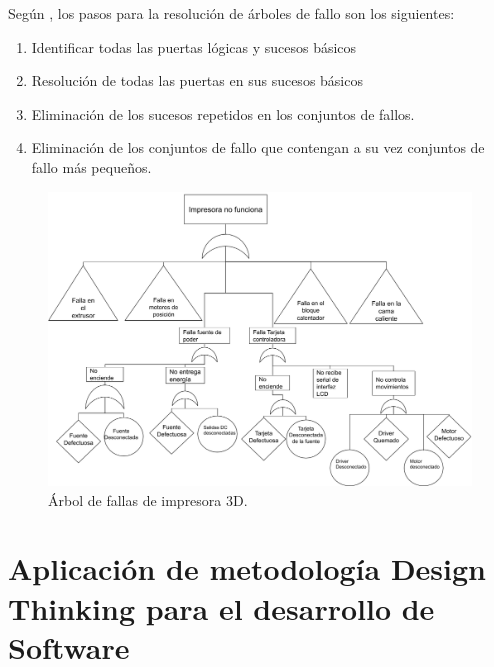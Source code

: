 Según \cite{pique1998}, los pasos para la resolución de árboles de fallo son los siguientes:

\begin{enumerate}
\item Identificar todas las puertas lógicas y sucesos básicos
\item Resolución de todas las puertas en sus sucesos básicos
\item Eliminación de los sucesos repetidos en los conjuntos de fallos.
\item Eliminación de los conjuntos de fallo que contengan a su vez conjuntos de fallo más pequeños.
\end{enumerate}

\begin{figure}
\centering
\includegraphics[scale=0.4]{images/arbol/arbol1.png}
\caption{Árbol de fallas de impresora 3D.}
\end{figure}

\section{Aplicación de metodología Design Thinking para el desarrollo de Software}







